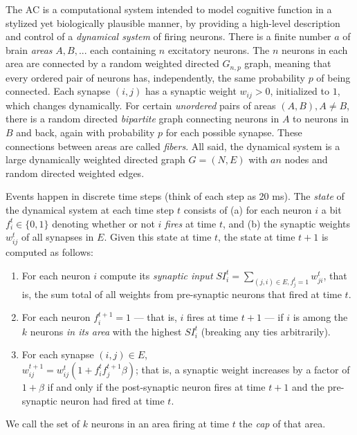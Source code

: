 \documentclass[11pt,a4paper]{article}
\begin{document}
The AC is a computational system intended to model cognitive function in a stylized yet biologically plausible manner, by providing a high-level description and control of a {\em dynamical system} of firing neurons. 
There is a finite number $a$ of brain {\em areas} $A, B,...$ each containing $n$ excitatory neurons.  The $n$ neurons in each area are connected by a random weighted directed $G_{n,p}$ graph, meaning that every ordered pair of neurons has, independently, the same probability $p$ of being connected.  Each synapse $(i,j)$ has a synaptic weight $w_{ij}>0$, initialized to $1$, which changes dynamically.  For certain {\em unordered} pairs of areas $(A,B), A\neq B$, there is a random directed {\em bipartite} graph connecting neurons in $A$ to neurons in $B$ and back, again with probability $p$ for each possible synapse.  These connections between areas are called {\em fibers}.  All said, the dynamical system is a large dynamically weighted directed graph $G=(N,E)$ with $an$ nodes and random directed weighted edges.

Events happen in discrete time steps (think of each step as  20 ms).  The {\em state} of the dynamical system at each time step $t$ consists of (a) for each neuron $i$ a bit $f_i^t\in \{0,1\}$ denoting whether or not $i$ {\em fires} at time $t$, and (b) the synaptic weights $w_{ij}^t$ of all synapses in $E$.  Given this state at time $t$, the state at time $t+1$ is computed as follows:
\begin{enumerate}
    \item For each neuron $i$ compute its {\em synaptic input} $SI_{i}^t=\sum_{(j,i)\in E, f_j^t=1}w_{ji}^t$, that is, the sum total of all weights from pre-synaptic neurons that fired at time $t$.
    \item For each neuron $f_i^{t+1}=1$ --- that is, $i$ fires at time $t+1$ --- if $i$ is among the $k$ neurons {\em in its area} with the highest $SI_i^t$ (breaking any ties arbitrarily).
    \item For each synapse $(i,j)\in E$,\\
    $w_{ij}^{t+1}=w_{ij}^t(1+ f^t_i f^{t+1}_j \beta)$; that is, a synaptic weight increases by a factor of $1+\beta$ if and only if the post-synaptic neuron fires at time $t+1$ and the pre-synaptic neuron had fired at time $t$.
\end{enumerate}
We call the set of $k$ neurons in an area firing at time $t$ the {\em cap} of that area.
\end{document}
